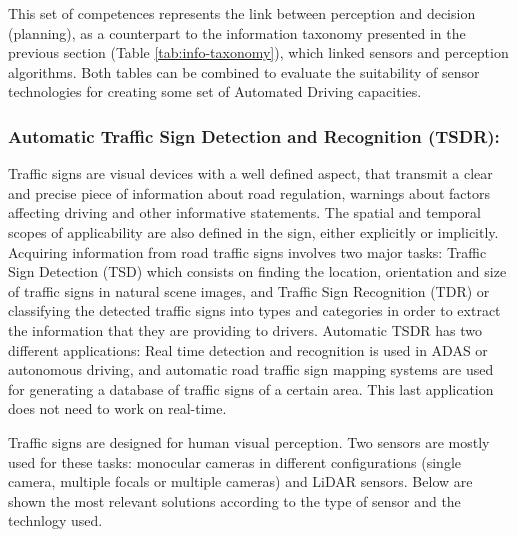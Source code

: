 This set of competences represents the link between perception and decision
(planning), as a counterpart to the information taxonomy presented in the
previous section (Table \ref{tab:info-taxonomy}),
which linked sensors and perception algorithms. 
Both tables can be combined to evaluate the suitability of sensor technologies
for creating some set of Automated Driving capacities.


\subsubsection{Automatic Traffic Sign Detection and Recognition (TSDR):} 
Traffic signs are visual devices with a well defined aspect, that transmit a 
clear and precise piece of information about road regulation, warnings about
factors affecting driving and other informative statements. The spatial and
temporal scopes of applicability are also defined in the sign, either 
explicitly or implicitly.
Acquiring information from road traffic signs involves two major tasks: 
Traffic Sign Detection (TSD) which consists on finding the location, 
orientation and size of traffic signs in natural scene images, and Traffic Sign 
Recognition (TDR) or classifying the detected traffic signs into types 
and categories in order to extract the information that they are providing to 
drivers.
Automatic TSDR has two different applications: Real time detection and
recognition is used in ADAS or autonomous driving, and automatic road traffic 
sign mapping systems are used for generating a database of traffic signs 
of a certain area. This last application does not need to work on real-time. 

Traffic signs are designed for human visual perception. Two sensors are mostly
used for these tasks: monocular cameras in different configurations 
(single camera, multiple focals or multiple cameras) and LiDAR sensors.
Below are shown the most relevant solutions according to the type of sensor 
and the technlogy used.


